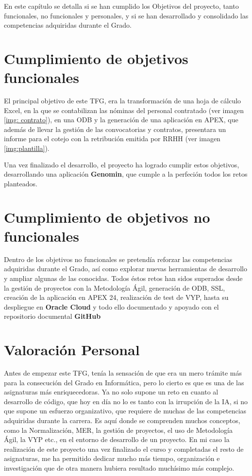 En este capítulo se detalla si se han cumplido los Objetivos del proyecto, tanto funcionales, no funcionales y personales, y si se han desarrollado y consolidado las competencias adquiridas durante el Grado.

\section{Cumplimiento de objetivos funcionales}
El principal objetivo de este \acrshort{TFG}, era la transformación de una hoja de cálculo Excel, en la que se contabilizan las nóminas del personal contratado (ver imagen \ref{img: contrato}), en una \acrshort{ODB} y la generación de una aplicación en \acrshort{APEX}, que además de llevar la gestión de las convocatorias y contratos, presentara un informe para el cotejo con la retribución emitida por RRHH (ver imagen \ref{img:plantilla}).

Una vez finalizado el desarrollo, el proyecto ha logrado cumplir estos objetivos, desarrollando una aplicación \textbf{Genomin}, que cumple a la perfeción todos los retos planteados.

\section{Cumplimiento de objetivos no funcionales}
Dentro de los objetivos no funcionales se pretendía reforzar las competencias adquiridas durante el Grado, así como explorar nuevas herramientas de desarrollo y ampliar algunas de las conocidas. Todos éstos retos han sidos superados desde la gestión de proyectos con la \gls{Metodología Ágil}, generación de \acrshort{ODB}, \acrshort{SSL}, creación de la aplicación en \acrshort{APEX} 24, realización de test de \acrshort{VYP},  hasta su despliegue en \textbf{Oracle Cloud} y todo ello documentado y apoyado con el repositorio documental \textbf{GitHub}

\section{Valoración Personal}
Antes de empezar este \acrshort{TFG}, tenía la sensación de que era un mero trámite más para la consecución del Grado en Informática, pero lo cierto es que es una de las asignaturas más enriquecedoras. Ya no solo supone un reto en cuanto al desarrollo de código, que hoy en día no lo es tanto con la irrupción de la \acrshort{IA}, si no que supone un esfuerzo organizativo, que requiere de muchas de las competencias adquiridas durante la carrera. Es aquí donde se comprenden muchos conceptos, como la \gls{Normalización}, \gls{MER}, la gestión de proyectos, el uso de \gls{Metodología Ágil}, la \acrfull{VYP} etc., en el entorno de desarrollo de un proyecto.
En mi caso la realización de este proyecto una vez finalizado el curso y completadas el resto de asignaturas, me ha permitido dedicar mucho más tiempo, organización e investigación que de otra manera hubiera resultado muchísimo más complejo.


